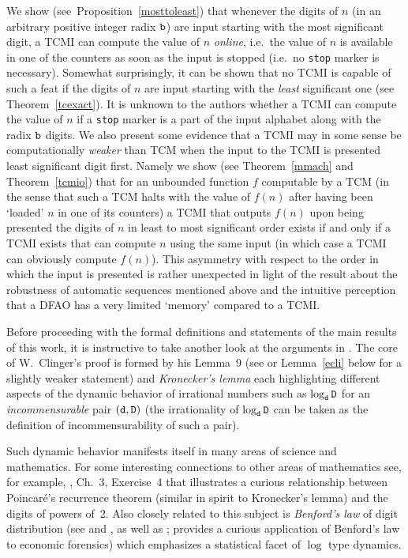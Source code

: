 \documentclass[12pt]{article}
\begin{document}
We show (see~Proposition~\ref{mosttoleast}) that whenever the digits of $n$
(in an arbitrary positive integer radix ${\tt b}$) are input starting
with the most significant digit, a TCMI can compute the value of $n$
{\it online\/}, i.e.~the value of $n$ is available in one of the
counters as soon as the input is stopped (i.e.~no {\tt stop} marker is
necessary). Somewhat surprisingly, it can be shown that no TCMI is
capable of such a feat if the digits of $n$ are input starting with the
{\it least\/} significant one (see Theorem~\ref{tcexact}). It is
unknown to the authors whether a TCMI can compute the value of $n$ if
a {\tt stop} marker is a part of the input alphabet along with the
radix ${\tt b}$ digits. We also present some evidence that a TCMI may in
some sense be
computationally {\it weaker\/} than TCM when the input to the TCMI is 
presented least significant digit first. Namely we show (see
Theorem~\ref{mmach} and Theorem~\ref{tcmio}) that for an
unbounded function $f$ computable by a TCM (in the sense that such a
TCM halts with the value of $f(n)$ after having been `loaded' $n$ in
one of its counters) a TCMI that outputs $f(n)$ upon being
presented the digits of $n$ in least to most significant order exists
if and only if a
TCMI exists that can compute $n$ using the same input (in which case a
TCMI can obviously compute $f(n)$). This
asymmetry with respect to the order in which the input is presented is
rather unexpected in light of the result about the robustness of
automatic sequences mentioned above and the intuitive perception that
a DFAO has a very limited `memory' compared to a TCMI.  

Before proceeding with the formal definitions and statements of the
main results of this work, it is instructive to take another
look at the arguments in \cite{Clinger}. The core of W.~Clinger's proof
is formed by his Lemma~9 (see \cite{Clinger} or Lemma~\ref{ecli} below
for a slightly weaker statement) 
and {\it Kronecker's lemma\/} each highlighting different aspects of
the dynamic behavior of irrational numbers such as $\log_{\tt d}{\tt D}$ for
an {\it incommensurable\/} pair $({\tt d}, {\tt D})$ (the irrationality of
$\log_{\tt d}{\tt D}$ can be taken as the definition of
incommensurability of such a pair). 

Such dynamic behavior manifests
itself in many areas of science and mathematics. For some interesting
connections to other areas of mathematics see, for example,
\cite{Arnold}, Ch.~3, Exercise~4 that illustrates a curious relationship
between Poincar\'e's recurrence theorem (similar in spirit to
Kronecker's lemma) and the digits of powers
of~2. Also closely related to this subject is {\it Benford's law\/} of digit 
distribution (see \cite{Benford} and
\cite{Newcomb}, as well as \cite{Hill}; \cite{Rauchetal} provides a
curious application of Benford's law to economic forensics) which
emphasizes a statistical facet of $\log$ type dynamics.
\end{document}
